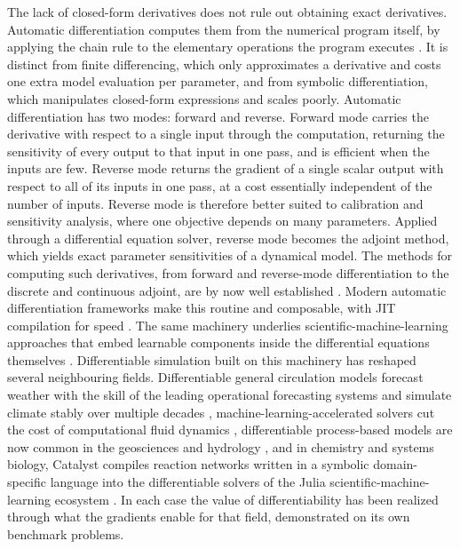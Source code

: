 \documentclass{article}
\begin{document}
The lack of closed-form derivatives does not rule out obtaining exact derivatives. Automatic differentiation computes them from the numerical program itself, by applying the chain rule to the elementary operations the program executes \citep{baydin2018, griewank2008}. It is distinct from finite differencing, which only approximates a derivative and costs one extra model evaluation per parameter, and from symbolic differentiation, which manipulates closed-form expressions and scales poorly. Automatic differentiation has two modes: forward and reverse. Forward mode carries the derivative with respect to a single input through the computation, returning the sensitivity of every output to that input in one pass, and is efficient when the inputs are few. Reverse mode returns the gradient of a single scalar output with respect to all of its inputs in one pass, at a cost essentially independent of the number of inputs. Reverse mode is therefore better suited to calibration and sensitivity analysis, where one objective depends on many parameters. Applied through a differential equation solver, reverse mode becomes the adjoint method, which yields exact parameter sensitivities of a dynamical model. The methods for computing such derivatives, from forward and reverse-mode differentiation to the discrete and continuous adjoint, are by now well established \citep{chen2018neural, hindmarsh2005, kidger2021on, sapienza2024}. Modern automatic differentiation frameworks make this routine and composable, with JIT compilation for speed \citep{jax2018github}. The same machinery underlies scientific-machine-learning approaches that embed learnable components inside the differential equations themselves \citep{rackauckas2020ude}. Differentiable simulation built on this machinery has reshaped several neighbouring fields. Differentiable general circulation models forecast weather with the skill of the leading operational forecasting systems and simulate climate stably over multiple decades \citep{kochkov2024neuralgcm}, machine-learning-accelerated solvers cut the cost of computational fluid dynamics \citep{kochkov2021jaxcfd}, differentiable process-based models are now common in the geosciences and hydrology \citep{shen2023diffhydrology}, and in chemistry and systems biology, Catalyst compiles reaction networks written in a symbolic domain-specific language into the differentiable solvers of the Julia scientific-machine-learning ecosystem \citep{loman2023}. In each case the value of differentiability has been realized through what the gradients enable for that field, demonstrated on its own benchmark problems.
\end{document}
